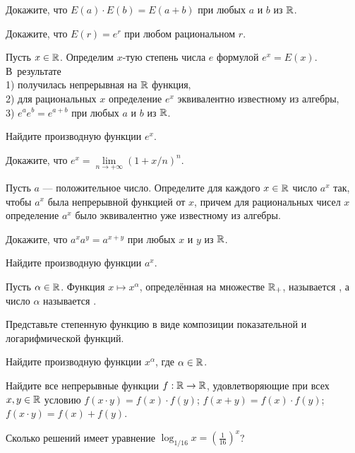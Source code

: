 \documentclass[a4paper, 12pt]{article}
\begin{document}
Докажите, что $E(a)\cdot E(b)=E(a+b)$ при любых $a$ и $b$ из $\mathbb{R}$.

Докажите, что $E(r)=e^r$ при любом рациональном $r$.

Пусть $x\in\mathbb{R}$. Определим $x$-тую степень числа
$e$ формулой $e^x=E(x)$. В~результате\\ %
1) получилась непрерывная на $\mathbb{R}$ функция, \\
2) для рациональных $x$ определение $e^x$ эквивалентно
известному из алгебры,\\
3) $e^ae^b=e^{a+b}$ при любых $a$ и $b$ из $\mathbb{R}$.

Найдите производную функции $e^x$.

Докажите, что
$e^x=\lim\limits_{n\rightarrow+\infty}\left(1+x/n\right)^{n}.$

Пусть $a$ --- положительное число. Определите для каждого $x\in\mathbb{R}$
число $a^x$  так, чтобы $a^x$ была непрерывной функцией от $x$,
причем для рациональных чисел $x$ определение $a^x$
было эквивалентно уже известному из алгебры.

Докажите, что $a^xa^y=a^{x+y}$ при любых $x$ и $y$ из $\mathbb{R}$.

Найдите производную функции $a^x$.

 Пусть $\alpha\in\mathbb{R}$.
Функция $x\mapsto x^\alpha$, определ\"енная на множестве
$\mathbb{R}_+$, называется , а число $\alpha$ называется
.

 Представьте степенную функцию в виде композиции
показательной и логарифмической функций.


Найдите производную функции $x^\alpha$, где $\alpha\in\mathbb{R}$.

 Найдите все непрерывные функции $f:\mathbb{R}\rightarrow\mathbb{R}$,
удовлетворяющие при всех $x,y\in\mathbb{R}$ условию
$f(x\cdot y)=f(x)\cdot f(y)$;
$f(x+y)=f(x)\cdot f(y)$;
$f(x\cdot y)=f(x)+f(y)$.

 Сколько решений имеет уравнение
$\log_{1/16}x=\left(\displaystyle\frac1{16}\right)^{\displaystyle x}$?



\end{document}

